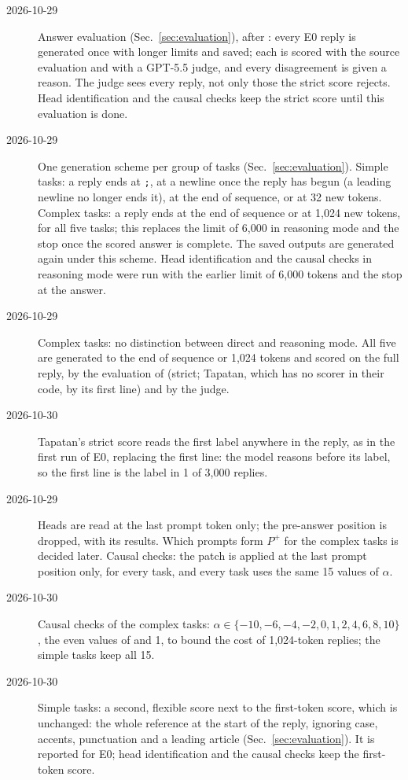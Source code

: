 \documentclass[11pt,a4paper]{article}
\begin{document}
\begin{description}
\item[2026-10-29] Answer evaluation (Sec.~\ref{sec:evaluation}), after \citet{hua2025flaw}: every E0 reply is generated once with longer limits and saved; each is scored with the source evaluation and with a GPT-5.5 judge, and every disagreement is given a reason. The judge sees every reply, not only those the strict score rejects. Head identification and the causal checks keep the strict score until this evaluation is done.
\item[2026-10-29] One generation scheme per group of tasks (Sec.~\ref{sec:evaluation}). Simple tasks: a reply ends at \texttt{;}, at a newline once the reply has begun (a leading newline no longer ends it), at the end of sequence, or at 32 new tokens. Complex tasks: a reply ends at the end of sequence or at 1,024 new tokens, for all five tasks; this replaces the limit of 6,000 in reasoning mode and the stop once the scored answer is complete. The saved outputs are generated again under this scheme. Head identification and the causal checks in reasoning mode were run with the earlier limit of 6,000 tokens and the stop at the answer.
\item[2026-10-29] Complex tasks: no distinction between direct and reasoning mode. All five are generated to the end of sequence or 1,024 tokens and scored on the full reply, by the evaluation of \citet{fu2026rules} (strict; Tapatan, which has no scorer in their code, by its first line) and by the judge.
\item[2026-10-30] Tapatan's strict score reads the first label anywhere in the reply, as in the first run of E0, replacing the first line: the model reasons before its label, so the first line is the label in 1 of 3,000 replies.
\item[2026-10-29] Heads are read at the last prompt token only; the pre-answer position is dropped, with its results. Which prompts form $P^{+}$ for the complex tasks is decided later. Causal checks: the patch is applied at the last prompt position only, for every task, and every task uses the same 15 values of $\alpha$.
\item[2026-10-30] Causal checks of the complex tasks: $\alpha\in\{-10,-6,-4,-2,0,1,2,4,6,8,10\}$, the even values of \citet{yang2026shared} and 1, to bound the cost of 1,024-token replies; the simple tasks keep all 15.
\item[2026-10-30] Simple tasks: a second, flexible score next to the first-token score, which is unchanged: the whole reference at the start of the reply, ignoring case, accents, punctuation and a leading article (Sec.~\ref{sec:evaluation}). It is reported for E0; head identification and the causal checks keep the first-token score.

\end{description}
\end{document}
